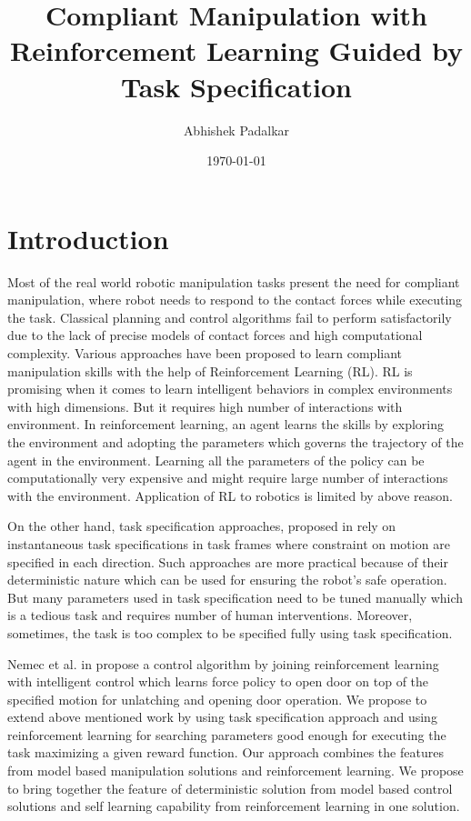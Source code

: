\documentclass[thesis]{mas_proposal}
\title{Compliant Manipulation with Reinforcement Learning Guided by Task Specification}
\author{Abhishek Padalkar}
\date{\today}
\begin{document}
\maketitle

\pagestyle{plain}

\chapter{Introduction}
Most of the real world robotic manipulation tasks present the need for compliant manipulation, where robot needs to respond to the contact forces while executing the task. Classical planning and control algorithms fail to perform satisfactorily due to the lack of precise models of contact forces and high computational complexity. Various approaches have been proposed to learn compliant manipulation skills with the help of Reinforcement Learning (RL). RL is promising when it comes to learn intelligent behaviors in complex environments with high dimensions. But it requires high number of interactions with environment. In reinforcement learning, an agent learns the skills by exploring the environment and adopting the parameters which governs the trajectory of the agent in the environment. Learning all the parameters of the policy can be computationally very expensive and might require large number of interactions with the environment. Application of RL to robotics is limited by above reason. 

On the other hand, task specification approaches, proposed in \cite{leidner2017cognitive,mason1981compliance,bruyninckx1996specification} rely on instantaneous task specifications in task frames where constraint on motion are specified in each direction. Such approaches are more practical because of their deterministic nature which can be used for ensuring the robot's safe operation. But many parameters used in task specification need to be tuned manually which is a tedious task and requires number of human interventions. Moreover, sometimes, the task is too complex to be specified fully using task specification. 

Nemec et al. in \cite{nemec2017door} propose a control algorithm by joining reinforcement learning with intelligent control which learns force policy to open door on top of the specified motion for unlatching and opening door operation. We propose to extend above mentioned work by using task specification approach and using reinforcement learning for searching parameters good enough for executing the task maximizing a given reward function. Our approach combines the features from model based manipulation solutions and reinforcement learning. We propose to bring together the feature of deterministic solution from model based control solutions and self learning capability from reinforcement learning in one solution.  
\end{document}
